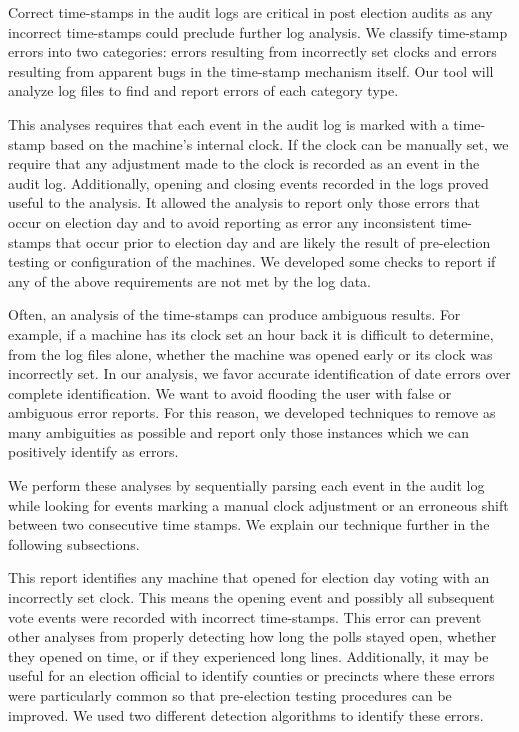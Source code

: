 \label{an:date} 
\smvertspace
Correct time-stamps in the audit logs
are critical in post election audits as any incorrect time-stamps
could preclude further log analysis. 
We classify time-stamp errors into two categories: errors
resulting from incorrectly set clocks and errors resulting from apparent bugs in
the time-stamp mechanism itself. Our tool will analyze log files to
find and report errors of each category type.

This analyses requires that each event in the audit log
is marked with a time-stamp based on the machine's internal clock. If
the clock can be manually set, we require that any adjustment made to
the clock is recorded as an event in the
audit log. Additionally, opening and closing events recorded in the logs proved
useful to the analysis. It allowed the analysis to report only those
errors that occur on election day and to avoid reporting as error
any inconsistent time-stamps that occur prior to election day and are
likely the result of pre-election testing or configuration of the
machines. We developed some checks to report if any of
the above requirements are not met by the log data.

Often, an analysis of the time-stamps can produce ambiguous
results. For example, if a machine has its clock set an hour back it
is difficult to determine, from the log files alone, whether the machine
was opened early or its clock was incorrectly set. In our analysis, we
favor accurate identification of date errors over complete
identification. We want to avoid flooding the user with false or
ambiguous error reports. For this reason, we developed techniques to
remove as many ambiguities as possible and report only those
instances which we can positively identify as errors.

We perform these analyses by sequentially parsing each event in the
audit log while looking for events marking a manual clock adjustment
or an erroneous shift between two consecutive time stamps. We explain
our technique further in the following subsections.

This report identifies any machine that opened for election day voting
with an incorrectly set clock.  This means the opening event and
possibly all subsequent vote events were recorded with incorrect
time-stamps. This error can prevent other analyses
from properly detecting how long the polls stayed open, whether they opened on
time, or if they experienced long lines. Additionally, it may be useful for an
election official to identify counties or precincts where these errors were
particularly common so that pre-election testing procedures can be improved.
We used two different detection algorithms to identify these errors.

